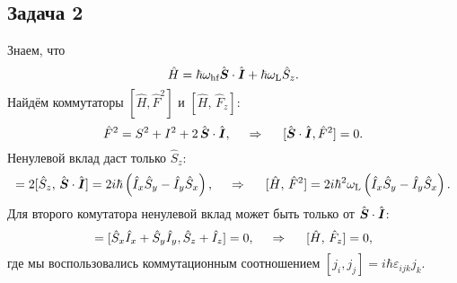 


\subsection*{Задача 2}

Знаем, что
\begin{equation*}
    \hat{H} = \hbar \omega_{\textnormal{hf}} \hat{\mbox{\boldmath $S$}} \cdot \hat{\mbox{\boldmath $I$}} + \hbar  \omega_{\textnormal{L}} \hat{S}_z.
\end{equation*}
Найдём коммутаторы $[\hat{H}, \hat{F}^2]$ и $[\hat{H},\, \hat{F}_z]$:
\begin{equation*}
    \hat{F}^2 = S^2 + I^2 + 2\, \hat{\mbox{\boldmath $S$}} \cdot \hat{\mbox{\boldmath $I$}},
    \hspace{0.5cm} \Rightarrow \hspace{0.5cm}
    [\hat{\mbox{\boldmath $S$}} \cdot \hat{\mbox{\boldmath $I$}}, \hat{F}^2] = 0.
\end{equation*}
Ненулевой вклад даст только $\hat{S}_z$:
\begin{equation*}
    [\hat{S}_z, \hat{F}^2] = 2 [\hat{S}_z,\, \hat{\vc{S}} \cdot \hat{\vc{I}}] = 2 i\hbar \left(\hat{I}_x \hat{S}_y - \hat{I}_y \hat{S}_x\right),
    \hspace{0.5cm} \Rightarrow \hspace{0.5cm}
    [\hat{H},\, \hat{F}^2] = 2 i \hbar^2 \sub{\omega}{L} \left(
        \hat{I}_x \hat{S}_y - \hat{I}_y \hat{S}_x
    \right).
\end{equation*}
Для второго комутатора ненулевой вклад может быть только от $\hat{\mbox{\boldmath $S$}} \cdot \hat{\mbox{\boldmath $I$}}$:
\begin{equation*}
    [\hat{\vc{S}} \cdot \hat{\vc{I}}, \hat{S}_z + \hat{I}_z] = 
    [\hat{S}_x \hat{I}_x + \hat{S}_y \hat{I}_y, \hat{S}_z + \hat{I}_z]
     = 0,
    \hspace{0.5cm} \Rightarrow \hspace{0.5cm}
    [\hat{H},\, \hat{F}_z] = 0,
\end{equation*}
где мы воспользовались коммутационным соотношением $[j_i, j_j] = i \hbar \varepsilon_{ijk} j_k$.